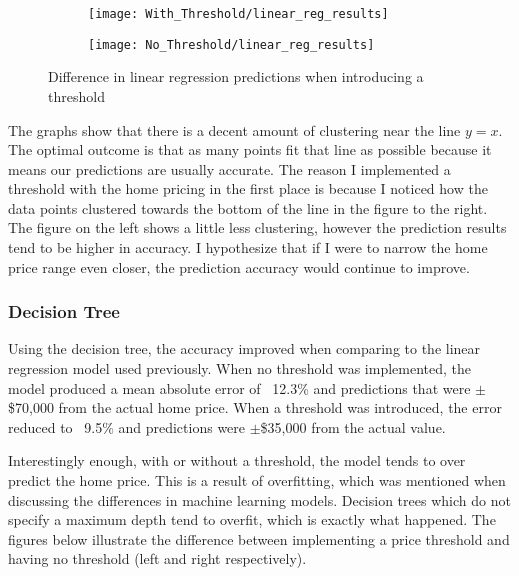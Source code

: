 \documentclass[12pt]{article}
\begin{document}
        \graphicspath{ {/home/amskyepi/Documents/Fall2022/CS315/Final_Project/Visuals} }
        \begin{figure}[H]
            \begin{subfigure}{0.5\textwidth}
                \centering
                \texttt{[image: With\_Threshold/linear\_reg\_results]}
            \end{subfigure}
            \hfill
            \begin{subfigure}{0.5\textwidth}
                \centering
                \texttt{[image: No\_Threshold/linear\_reg\_results]}
            \end{subfigure}
            \caption{Difference in linear regression predictions when introducing a threshold}
        \end{figure}

        The graphs show that there is a decent amount of clustering near the line $y = x$. The optimal outcome is that as many points fit 
        that line as possible because it means our predictions are usually accurate. The reason I implemented a threshold with the home pricing
        in the first place is because I noticed how the data points clustered towards the bottom of the line in the figure to the right. The figure 
        on the left shows a little less clustering, however the prediction results tend to be higher in accuracy. I hypothesize that if I were to 
        narrow the home price range even closer, the prediction accuracy would continue to improve. 

        \subsubsection{Decision Tree}
        Using the decision tree, the accuracy improved when comparing to the linear regression model used previously. When no threshold was 
        implemented, the model produced a mean absolute error of ~12.3\% and predictions that were $\pm$\$70,000 from the actual home price. 
        When a threshold was introduced, the error reduced to ~9.5\% and predictions were $\pm$\$35,000 from the actual value. 
        
        Interestingly enough, with or without a threshold, the model tends to over predict the home price. This is a result of overfitting, which was mentioned when 
        discussing the differences in machine learning models. Decision trees which do not specify a maximum depth tend to overfit, which is exactly 
        what happened. The figures below illustrate the difference between implementing a price threshold and having no threshold (left and right respectively).
\end{document}
